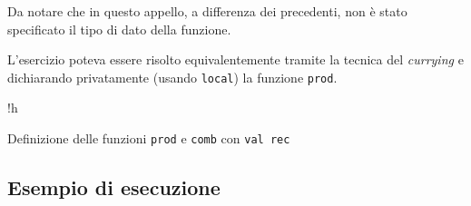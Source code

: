 Da notare che in questo appello, a differenza dei precedenti, non è stato specificato il tipo di dato della funzione.

L'esercizio poteva essere risolto equivalentemente tramite la tecnica del \emph{currying} e dichiarando privatamente (usando \texttt{local}) la funzione \texttt{prod}.

\begin{listing}{!h}
\caption{Definizione delle funzioni \texttt{prod} e \texttt{comb} con \texttt{val rec}}
\end{listing}

\subsection*{Esempio di esecuzione}
